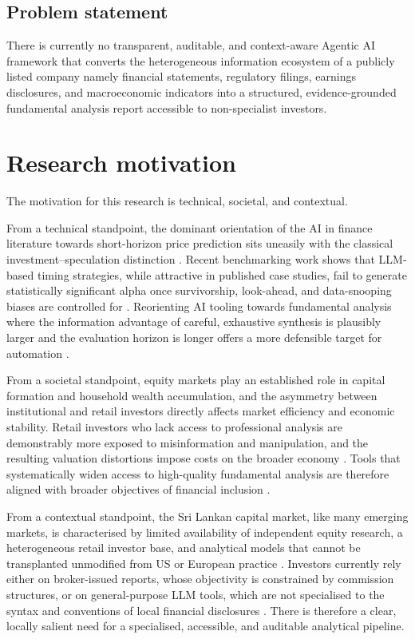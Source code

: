\subsection{Problem statement}

There is currently no transparent, auditable, and context-aware Agentic AI framework that converts the heterogeneous information ecosystem of a publicly listed company namely financial statements, regulatory filings, earnings disclosures, and macroeconomic indicators into a structured, evidence-grounded fundamental analysis report accessible to non-specialist investors.

\section{Research motivation}
\label{sec:motivation}

The motivation for this research is technical, societal, and contextual. 


From a technical standpoint, the dominant orientation of the AI in finance literature towards short-horizon price prediction sits uneasily with the classical investment--speculation distinction \citep{Graham2006,GrahamDodd2008}. Recent benchmarking work shows that LLM-based timing strategies, while attractive in published case studies, fail to generate statistically significant alpha once survivorship, look-ahead, and data-snooping biases are controlled for \citep{Li2026FINSABER}. Reorienting AI tooling towards fundamental analysis where the information advantage of careful, exhaustive synthesis is plausibly larger and the evaluation horizon is longer offers a more defensible target for automation \citep{Fatouros2025MarketSense}.

From a societal standpoint, equity markets play an established role in capital formation and household wealth accumulation, and the asymmetry between institutional and retail investors directly affects market efficiency and economic stability. Retail investors who lack access to professional analysis are demonstrably more exposed to misinformation and manipulation, and the resulting valuation distortions impose costs on the broader economy \citep{Li2025FSA}. Tools that systematically widen access to high-quality fundamental analysis are therefore aligned with broader objectives of financial inclusion \citep{Bangun2025}.

From a contextual standpoint, the Sri Lankan capital market, like many emerging markets, is characterised by limited availability of independent equity research, a heterogeneous retail investor base, and analytical models that cannot be transplanted unmodified from US or European practice \citep{Bangun2025,Li2026FINSABER}. Investors currently rely either on broker-issued reports, whose objectivity is constrained by commission structures, or on general-purpose LLM tools, which are not specialised to the syntax and conventions of local financial disclosures \citep{Papasotiriou2024,Cheng2025}. There is therefore a clear, locally salient need for a specialised, accessible, and auditable analytical pipeline.

